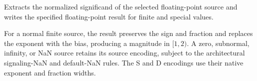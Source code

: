 Extracts the normalized significand of the selected floating-point source and writes the specified floating-point result for finite and special values.

For a normal finite source, the result preserves the sign and fraction and replaces the exponent with the bias,
producing a magnitude in \([1,2)\). A zero, subnormal, infinity, or NaN source retains its source encoding, subject
to the architectural signaling-NaN and default-NaN rules. The S and D encodings use their native exponent and fraction
widths.
